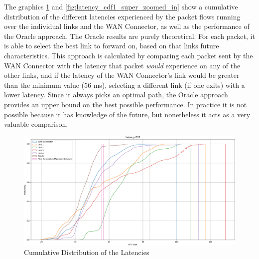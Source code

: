 The graphics \ref{fig:latency_cdf1} and \ref{fig:latency_cdf1_super_zoomed_in} show a cumulative distribution of the different latencies experienced by the packet flows running over the individual links and the WAN Connector, as well as the performance of the Oracle approach. The Oracle results are purely theoretical. For each packet, it is able to select the best link to forward on, based on that links future characteristics. This approach is calculated by comparing each packet sent by the WAN Connector with the latency that packet \textit{would} experience on any of the other links, and if the latency of the WAN Connector's link would be greater than the minimum value (56 ms), selecting a different link (if one exits) with a lower latency. Since it always picks an optimal path, the Oracle approach provides an upper bound on the best possible performance. In practice it is not possible because it has knowledge of the future, but nonetheless it acts as a very valuable comparison.

\begin{figure}[h]
    \centering
        \includegraphics[height=0.8\textwidth,width=\textwidth]{fig/latency_cdf1.png}
        \caption{Cumulative Distribution of the Latencies}
        \label{fig:latency_cdf1}
\end{figure}

